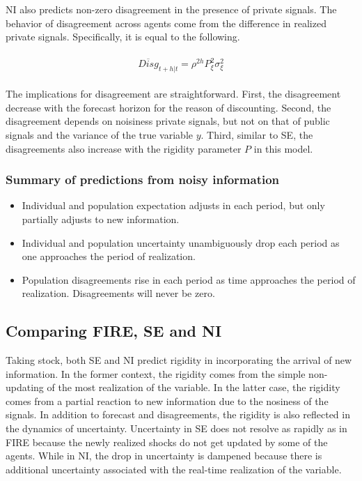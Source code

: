 \documentclass[12pt]{article}
\begin{document}
	NI also predicts non-zero disagreement in the presence of private signals. The behavior of disagreement across agents come from the difference in realized private signals. Specifically, it is equal to the following. 
	
	\begin{eqnarray}
		\begin{aligned}
			\overline {Disg}_{t+h|t} = \rho^{2h} P^2_\xi \sigma^2_\xi  
		\end{aligned}
	\end{eqnarray}
	
	The implications for disagreement are straightforward. First, the disagreement decrease with the forecast horizon for the reason of discounting. Second, the disagreement depends on noisiness private signals, but not on that of public signals and the variance of the true variable $y$. Third, similar to SE, the disagreements also increase with the rigidity parameter $P$ in this model.
	
	\subsubsection{Summary of predictions from noisy information}
	
	\begin{itemize}
		\item Individual and population expectation adjusts in each period, but only partially adjusts to new information. 
		\item  Individual and population uncertainty unambiguously drop each period as one approaches the period of realization.  
		\item  Population disagreements rise in each period as time approaches the period of realization. Disagreements will never be zero. 
	\end{itemize}
	
	
	\subsection{Comparing FIRE, SE and NI}
	
	Taking stock, both SE and NI predict rigidity in incorporating the arrival of new information. In the former context, the rigidity comes from the simple non-updating of the most realization of the variable. In the latter case, the rigidity comes from a partial reaction to new information due to the nosiness of the signals.  In addition to forecast and disagreements, the rigidity is also reflected in the dynamics of uncertainty.  Uncertainty in SE does not resolve as rapidly as in FIRE because the newly realized shocks do not get updated by some of the agents. While in NI, the drop in uncertainty is dampened because there is additional uncertainty associated with the real-time realization of the variable.  
	
\end{document}
